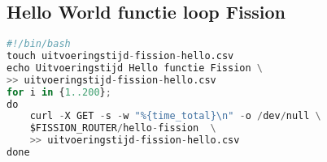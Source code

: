 \subsection{Hello World functie loop Fission}
\begin{lstlisting}[language=python]
#!/bin/bash
touch uitvoeringstijd-fission-hello.csv
echo Uitvoeringstijd Hello functie Fission \
>> uitvoeringstijd-fission-hello.csv
for i in {1..200};
do
    curl -X GET -s -w "%{time_total}\n" -o /dev/null \
    $FISSION_ROUTER/hello-fission  \
    >> uitvoeringstijd-fission-hello.csv
done
\end{lstlisting}
